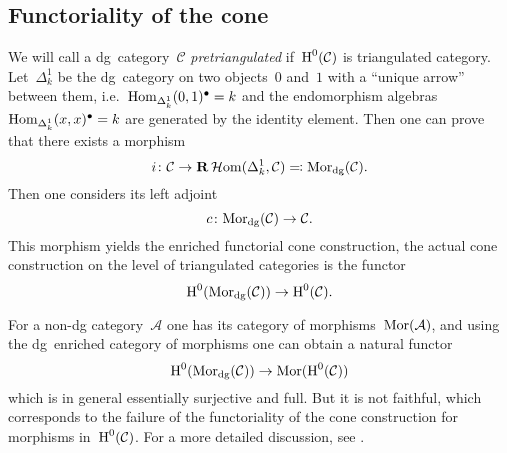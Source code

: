 \subsection{Functoriality of the cone}
We will call a dg~category~$\mathcal{C}$ \emph{pretriangulated} if~$\operatorname{H}^0(\mathcal{C})$ is triangulated category. Let~$\Delta_k^1$ be the dg~category on two objects~$0$ and~$1$ with a ``unique arrow'' between them, i.e.~$\mathrm{Hom}_{\Delta_k^1}(0,1)^\bullet=k$ and the endomorphism algebras~$\mathrm{Hom}_{\Delta_k^1}(x,x)^\bullet=k$ are generated by the identity element.  Then one can prove that there exists a morphism
\begin{equation}
  i\colon\mathcal{C}\to\mathbf{R}\operatorname{\mathcal{H}om}(\Delta_k^1,\mathcal{C})\eqqcolon\mathrm{Mor}_{\mathrm{dg}}(\mathcal{C}).
\end{equation}
Then one considers its left adjoint
\begin{equation}
  c\colon\mathrm{Mor}_{\mathrm{dg}}(\mathcal{C})\to\mathcal{C}.
\end{equation}
This morphism yields the enriched functorial cone construction, the actual cone construction on the level of triangulated categories is the functor
\begin{equation}
  \operatorname{H}^0(\mathrm{Mor}_{\mathrm{dg}}(\mathcal{C}))\to\operatorname{H}^0(\mathcal{C}).
\end{equation}

For a non-dg category~$\mathcal{A}$ one has its category of morphisms~$\mathrm{Mor}(\mathcal{A})$, and using the dg~enriched category of morphisms one can obtain a natural functor
\begin{equation}
  \operatorname{H}^0(\mathrm{Mor}_{\mathrm{dg}}(\mathcal{C}))\to\mathrm{Mor}(\operatorname{H}^0(\mathcal{C}))
\end{equation}
which is in general essentially surjective and full. But it is not faithful, which corresponds to the failure of the functoriality of the cone construction for morphisms in~$\operatorname{H}^0(\mathcal{C})$. For a more detailed discussion, see \cite[section 5.1]{lnm2008}.

